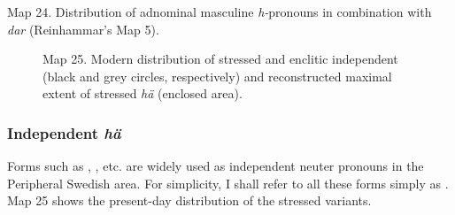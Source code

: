 \textmd{  }Map 24. Distribution of adnominal masculine \newline
\textit{h-}pronouns in combination with \textit{dar} (Reinhammar’s Map 5).




\begin{figure}[h]
\centering
\begin{minipage}{2.66667in}
\end{minipage}
\end{figure}
\clearpage%


\begin{figure}[h]
\centering
\begin{minipage}{5.51042in}
\label{bkm:Ref263951196}Map 25. Modern distribution of stressed and enclitic independent  (black and grey circles, respectively) and reconstructed maximal extent of stressed \textit{hä} (enclosed area).
\end{minipage}
\end{figure}
\clearpage\subsubsection[Independent hä]{Independent \textit{hä}}
Forms such as , , etc. are widely used as independent neuter pronouns in the Peripheral Swedish area. For simplicity, I shall refer to all these forms simply as . Map 25 shows the present-day distribution of the stressed variants. 

